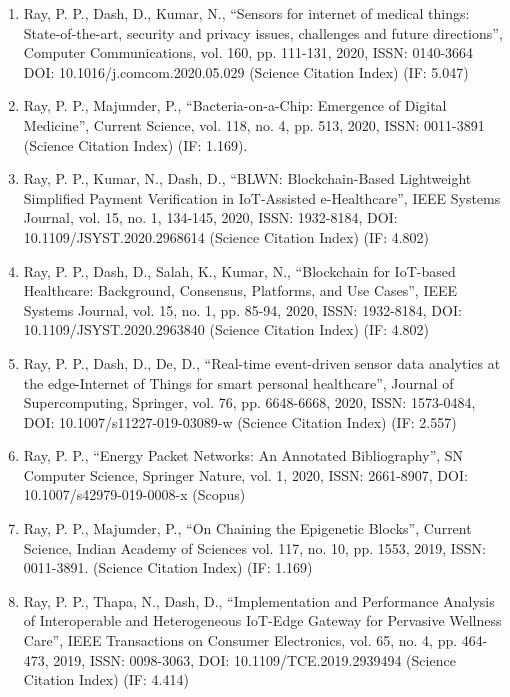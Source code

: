 \documentclass[11pt,a4paper]{moderncv}
\begin{document}
\begin{adjustwidth}{6em}{0pt}
\begin{enumerate}
		\item Ray, P. P., Dash, D., Kumar, N., “Sensors for internet of medical things: State-of-the-art, security and privacy issues, challenges and future directions”, Computer Communications, vol. 160, pp. 111-131, 2020, ISSN: 0140-3664 DOI: 10.1016/j.comcom.2020.05.029 (Science Citation Index) (IF: 5.047) 
		
		\item Ray, P. P., Majumder, P., “Bacteria-on-a-Chip: Emergence of Digital Medicine”, Current Science, vol. 118, no. 4, pp. 513, 2020, ISSN: 0011-3891 (Science Citation Index) (IF: 1.169). 
		
		\item Ray, P. P., Kumar, N., Dash, D., “BLWN: Blockchain-Based Lightweight Simplified Payment Verification in IoT-Assisted e-Healthcare”, IEEE Systems Journal, vol. 15, no. 1, 134-145, 2020, ISSN: 1932-8184, DOI: 10.1109/JSYST.2020.2968614 (Science Citation Index) (IF: 4.802) 
		
		\item Ray, P. P., Dash, D., Salah, K., Kumar, N., “Blockchain for IoT-based Healthcare: Background, Consensus, Platforms, and Use Cases”, IEEE Systems Journal, vol. 15, no. 1, pp. 85-94, 2020, ISSN: 1932-8184, DOI: 10.1109/JSYST.2020.2963840 (Science Citation Index) (IF: 4.802) 
		
		\item Ray, P. P., Dash, D., De, D., “Real-time event-driven sensor data analytics at the edge-Internet of Things for smart personal healthcare”, Journal of Supercomputing, Springer, vol. 76, pp. 6648-6668, 2020, ISSN: 1573-0484, DOI: 10.1007/s11227-019-03089-w (Science Citation Index) (IF: 2.557) 
		
		\item Ray, P. P., “Energy Packet Networks: An Annotated Bibliography”, SN Computer Science, Springer Nature, vol. 1, 2020, ISSN: 2661-8907, DOI: 10.1007/s42979-019-0008-x (Scopus)
		
		\item Ray, P. P., Majumder, P., “On Chaining the Epigenetic Blocks”, Current Science, Indian Academy of Sciences vol. 117, no. 10, pp. 1553, 2019, ISSN: 0011-3891. (Science Citation Index) (IF: 1.169)
		
		\item Ray, P. P., Thapa, N., Dash, D., “Implementation and Performance Analysis of Interoperable and Heterogeneous IoT-Edge Gateway for Pervasive Wellness Care”, IEEE Transactions on Consumer Electronics, vol. 65, no. 4, pp. 464-473, 2019, ISSN: 0098-3063, DOI: 10.1109/TCE.2019.2939494 (Science Citation Index) (IF: 4.414) 
		

\end{enumerate}
\end{adjustwidth}
\end{document}
